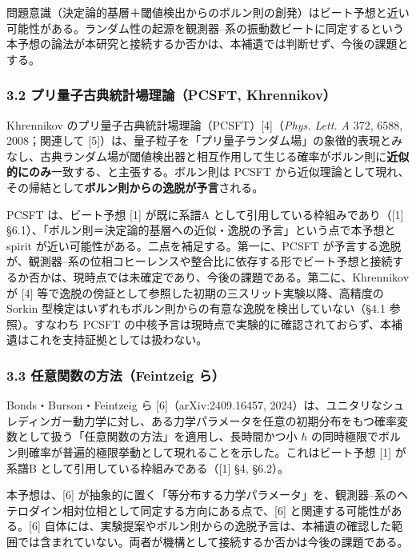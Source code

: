 \documentclass[
]{ltjsarticle}
\begin{document}
問題意識（決定論的基層＋閾値検出からのボルン則の創発）はビート予想と近い可能性がある。ランダム性の起源を観測器--系の振動数ビートに同定するという本予想の論法が本研究と接続するか否かは、本補遺では判断せず、今後の課題とする。

\subsubsection{3.2 プリ量子古典統計場理論（PCSFT,
Khrennikov）}\label{ux30d7ux30eaux91cfux5b50ux53e4ux5178ux7d71ux8a08ux5834ux7406ux8ad6pcsft-khrennikov}

Khrennikov のプリ量子古典統計場理論（PCSFT）{[}4{]}（\emph{Phys. Lett.
A} 372, 6588, 2008；関連して
{[}5{]}）は、量子粒子を「プリ量子ランダム場」の象徴的表現とみなし、古典ランダム場が閾値検出器と相互作用して生じる確率がボルン則に\textbf{近似的にのみ}一致する、と主張する。ボルン則は
PCSFT
から近似理論として現れ、その帰結として\textbf{ボルン則からの逸脱が予言}される。

PCSFT は、ビート予想 {[}1{]} が既に系譜A
として引用している枠組みであり（{[}1{]}
§6.1）、「ボルン則＝決定論的基層への近似・逸脱の予言」という点で本予想と
spirit が近い可能性がある。二点を補足する。第一に、PCSFT
が予言する逸脱が、観測器--系の位相コヒーレンスや整合比に依存する形でビート予想と接続するか否かは、現時点では未確定であり、今後の課題である。第二に、Khrennikov
が {[}4{]}
等で逸脱の傍証として参照した初期の三スリット実験以降、高精度の Sorkin
型検定はいずれもボルン則からの有意な逸脱を検出していない（§4.1
参照）。すなわち PCSFT
の中核予言は現時点で実験的に確認されておらず、本補遺はこれを支持証拠としては扱わない。

\subsubsection{3.3 任意関数の方法（Feintzeig
ら）}\label{ux4efbux610fux95a2ux6570ux306eux65b9ux6cd5feintzeig-ux3089}

Bonds・Burson・Feintzeig ら {[}6{]}（arXiv:2409.16457,
2024）は、ユニタリなシュレディンガー動力学に対し、ある力学パラメータを任意の初期分布をもつ確率変数として扱う「任意関数の方法」を適用し、長時間かつ小
\(\hbar\)
の同時極限でボルン則確率が普遍的極限挙動として現れることを示した。これはビート予想
{[}1{]} が系譜B として引用している枠組みである（{[}1{]} §4, §6.2）。

本予想は、{[}6{]}
が抽象的に置く「等分布する力学パラメータ」を、観測器--系のヘテロダイン相対位相として同定する方向にある点で、{[}6{]}
と関連する可能性がある。{[}6{]}
自体には、実験提案やボルン則からの逸脱予言は、本補遺の確認した範囲では含まれていない。両者が機構として接続するか否かは今後の課題である。
\end{document}
